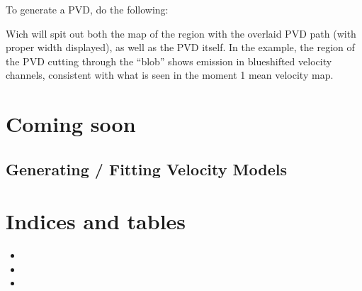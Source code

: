 \documentclass[letterpaper,10pt,english]{sphinxmanual}
\let\sphinxpxdimen\pdfpxdimen\else\newdimen\sphinxpxdimen
\begin{document}
\sphinxAtStartPar
To generate a PVD, do the following:

\begin{sphinxVerbatim}[commandchars=\\\{\}]
       
  
\end{sphinxVerbatim}

\sphinxAtStartPar
Wich will spit out both the map of the region with the overlaid PVD path (with proper width displayed), as
well as the PVD itself. In the example, the region of the PVD cutting through the “blob” shows emission in
blue\sphinxhyphen{}shifted velocity channels, consistent with what is seen in the moment 1 mean velocity map.

\noindent\sphinxincludegraphics[width=600\sphinxpxdimen]{{example_pvd}.png}


\chapter{Coming soon}
\label{\detokenize{index:coming-soon}}
\sphinxstepscope


\section{Generating / Fitting Velocity Models}
\label{\detokenize{modeling:generating-fitting-velocity-models}}\label{\detokenize{modeling::doc}}

\chapter{Indices and tables}
\label{\detokenize{index:indices-and-tables}}\begin{itemize}
\item {} 
\sphinxAtStartPar
{}

\item {} 
\sphinxAtStartPar
{}

\item {} 
\sphinxAtStartPar
{}

\end{itemize}
\end{document}
